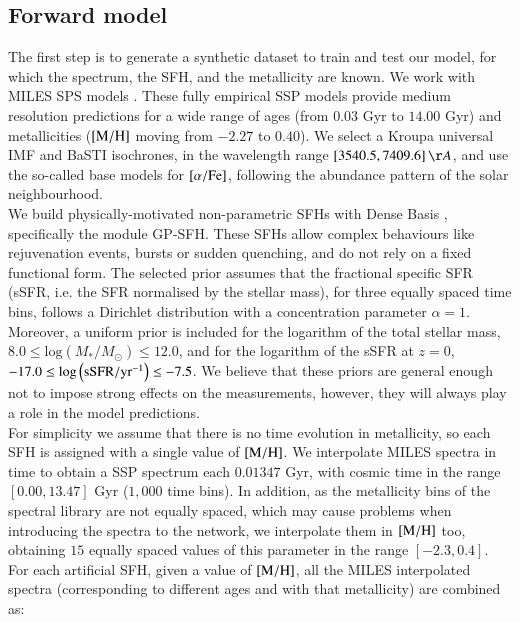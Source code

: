 \subsection{Forward model}
\label{forward}

The first step is to generate a synthetic dataset to train and test our model, for which the spectrum, the SFH, and the metallicity are known. We work with MILES SPS models \citep{Vazdekis_2010}.  These fully empirical SSP models provide medium resolution \citep[$\text{FWHM}=2.51\AA$,][]{falcon11} predictions for a wide range of ages (from $0.03$ Gyr to $14.00$ Gyr) and metallicities ($\rm{[M/H]}$ moving from $-2.27$ to $0.40$). We select a Kroupa universal IMF and BaSTI isochrones, in the wavelength range $[3540.5,7409.6] \, \AA$, and use the so-called base models for $[\alpha/\rm{Fe}]$, following the abundance pattern of the solar neighbourhood.\\

We build physically-motivated non-parametric SFHs with Dense Basis \citep{Iyer_2017}, specifically the module GP-SFH. These SFHs allow complex behaviours like rejuvenation events, bursts or sudden quenching, and do not rely on a fixed functional form. The selected prior assumes that the fractional specific SFR (sSFR, i.e. the SFR normalised by the stellar mass), for three equally spaced time bins, follows a Dirichlet distribution \citep{Leja_2017} with a concentration parameter $\alpha=1$. Moreover, a uniform prior is included for the logarithm of the total stellar mass, $8.0 \leq \text{log} \left(M_{*}/M_{\odot}\right) \leq 12.0$, and for the logarithm of the sSFR at $z=0$, $-17.0 \leq \text{log} \left(\text{sSFR}/ \rm{yr}^{-1}\right) \leq -7.5$. We believe that these priors are general enough not to impose strong effects on the measurements, however, they will always play a role in the model predictions.\\


For simplicity we assume that there is no time evolution in metallicity, so each SFH is assigned with a single value of $\rm{[M/H]}$. We interpolate MILES spectra in time to obtain a SSP spectrum each $0.01347$ Gyr, with cosmic time in the range $[0.00,13.47]$ Gyr ($1{,}000$ time bins). In addition, as the metallicity bins of the spectral library are not equally spaced, which may cause problems when introducing the spectra to the network, we interpolate them in $\rm{[M/H]}$ too, obtaining $15$ equally spaced values of this parameter in the range $[-2.3,0.4]$. For each artificial SFH, given a value of $\rm{[M/H]}$, all the MILES interpolated spectra (corresponding to different ages and with that metallicity) are combined as:

